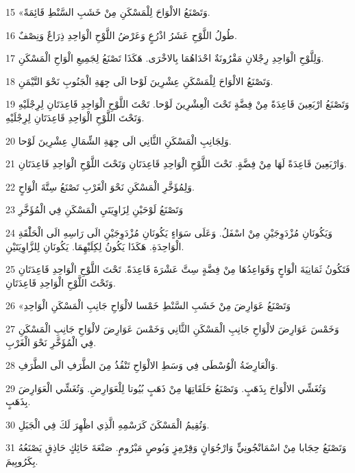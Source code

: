 \par 15 «وَتَصْنَعُ الالْوَاحَ لِلْمَسْكَنِ مِنْ خَشَبِ السَّنْطِ قَائِمَةً.
\par 16 طُولُ اللَّوْحِ عَشَرُ اذْرُعٍ وَعَرْضُ اللَّوْحِ الْوَاحِدِ ذِرَاعٌ وَنِصْفٌ.
\par 17 وَلِلَّوْحِ الْوَاحِدِ رِجْلانِ مَقْرُونَةٌ احْدَاهُمَا بِالاخْرَى. هَكَذَا تَصْنَعُ لِجَمِيعِ الْوَاحِ الْمَسْكَنِ.
\par 18 وَتَصْنَعُ الالْوَاحَ لِلْمَسْكَنِ عِشْرِينَ لَوْحا الَى جِهَةِ الْجَنُوبِ نَحْوَ التَّيْمَنِ.
\par 19 وَتَصْنَعُ ارْبَعِينَ قَاعِدَةً مِنْ فِضَّةٍ تَحْتَ الْعِشْرِينَ لَوْحا. تَحْتَ اللَّوْحِ الْوَاحِدِ قَاعِدَتَانِ لِرِجْلَيْهِ وَتَحْتَ اللَّوْحِ الْوَاحِدِ قَاعِدَتَانِ لِرِجْلَيْهِ.
\par 20 وَلِجَانِبِ الْمَسْكَنِ الثَّانِي الَى جِهَةِ الشِّمَالِ عِشْرِينَ لَوْحا.
\par 21 وَارْبَعِينَ قَاعِدَةً لَهَا مِنْ فِضَّةٍ. تَحْتَ اللَّوْحِ الْوَاحِدِ قَاعِدَتَانِ وَتَحْتَ اللَّوْحِ الْوَاحِدِ قَاعِدَتَانِ.
\par 22 وَلِمُؤَخَّرِ الْمَسْكَنِ نَحْوَ الْغَرْبِ تَصْنَعُ سِتَّةَ الْوَاحٍ.
\par 23 وَتَصْنَعُ لَوْحَيْنِ لِزَاوِيَتَيِ الْمَسْكَنِ فِي الْمُؤَخَّرِ
\par 24 وَيَكُونَانِ مُزْدَوِجَيْنِ مِنْ اسْفَلُ. وَعَلَى سَوَاءٍ يَكُونَانِ مُزْدَوِجَيْنِ الَى رَاسِهِ الَى الْحَلَْقَةِ الْوَاحِدَةِ. هَكَذَا يَكُونُ لِكِلَيْهِمَا. يَكُونَانِ لِلزَّاوِيَتَيْنِ.
\par 25 فَتَكُونُ ثَمَانِيَةَ الْوَاحٍ وَقَوَاعِدُهَا مِنْ فِضَّةٍ سِتَّ عَشْرَةَ قَاعِدَةً. تَحْتَ اللَّوْحِ الْوَاحِدِ قَاعِدَتَانِ وَتَحْتَ اللَّوْحِ الْوَاحِدِ قَاعِدَتَانِ.
\par 26 «وَتَصْنَعُ عَوَارِضَ مِنْ خَشَبِ السَّنْطِ خَمْسا لالْوَاحِ جَانِبِ الْمَسْكَنِ الْوَاحِدِ
\par 27 وَخَمْسَ عَوَارِضَ لالْوَاحِ جَانِبِ الْمَسْكَنِ الثَّانِي وَخَمْسَ عَوَارِضَ لالْوَاحِ جَانِبِ الْمَسْكَنِ فِي الْمُؤَخَّرِ نَحْوَ الْغَرْبِ.
\par 28 وَالْعَارِضَةُ الْوُسْطَى فِي وَسَطِ الالْوَاحِ تَنْفُذُ مِنَ الطَّرَفِ الَى الطَّرَفِ.
\par 29 وَتُغَشِّي الالْوَاحَ بِذَهَبٍ. وَتَصْنَعُ حَلَقَاتِهَا مِنْ ذَهَبٍ بُيُوتا لِلْعَوَارِضِ. وَتُغَشِّي الْعَوَارِضَ بِذَهَبٍ.
\par 30 وَتُقِيمُ الْمَسْكَنَ كَرَسْمِهِ الَّذِي اظْهِرَ لَكَ فِي الْجَبَلِ.
\par 31 وَتَصْنَعُ حِجَابا مِنْ اسْمَانْجُونِيٍّ وَارْجُوَانٍ وَقِرْمِزٍ وَبُوصٍ مَبْرُومٍ. صَنْعَةَ حَائِكٍ حَاذِقٍ يَصْنَعُهُ بِكَرُوبِيمَ.
